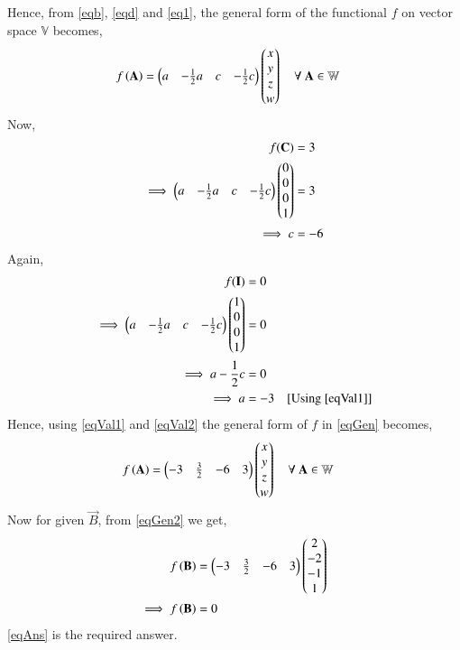 \documentclass[journal,12pt,twocolumn]{IEEEtran}
\begin{document}
Hence, from \eqref{eqb}, \eqref{eqd} and \eqref{eq1}, the general form of the functional $f$ on vector space $\mathbb{V}$ becomes,
\begin{align}
f\left(\mathbf{A}\right) &= \begin{pmatrix}a&-\frac{1}{2}a&c&-\frac{1}{2}c\end{pmatrix}\begin{pmatrix}x\\y\\z\\w\end{pmatrix}\quad{\text{$\forall$ $\mathbf{A} \in \mathbb{W}$}}\label{eqGen}
\end{align}
Now,
\begin{align}
f(\mathbf{C}) &= 3\\
\implies \begin{pmatrix}a&-\frac{1}{2}a&c&-\frac{1}{2}c\end{pmatrix}\begin{pmatrix}0\\0\\0\\1\end{pmatrix} &= 3\\
\implies c &= -6\label{eqVal1}
\end{align}
Again,
\begin{align}
f(\mathbf{I}) &= 0\\
\implies \begin{pmatrix}a&-\frac{1}{2}a&c&-\frac{1}{2}c\end{pmatrix}\begin{pmatrix}1\\0\\0\\1\end{pmatrix} &= 0\\
\implies a-\frac{1}{2}c &= 0\\
\implies a &= -3 \quad{\text{[Using \eqref{eqVal1}]}}\label{eqVal2}
\end{align}
Hence, using \eqref{eqVal1} and \eqref{eqVal2} the general form of $f$ in \eqref{eqGen} becomes,
\begin{align}
f\left(\mathbf{A}\right) &= \begin{pmatrix}-3&\frac{3}{2}&-6&3\end{pmatrix}\begin{pmatrix}x\\y\\z\\w\end{pmatrix} \quad{\text{$\forall$ $\mathbf{A} \in \mathbb{W}$}}\label{eqGen2}
\end{align}
Now for given $\vec{B}$, from \eqref{eqGen2} we get,
\begin{align}
f\left(\mathbf{B}\right) &= \begin{pmatrix}-3&\frac{3}{2}&-6&3\end{pmatrix}\begin{pmatrix}2\\-2\\-1\\1\end{pmatrix}\\
\implies f\left(\mathbf{B}\right) &= 0 \label{eqAns}
\end{align}
\eqref{eqAns} is the required answer.
\end{document}
